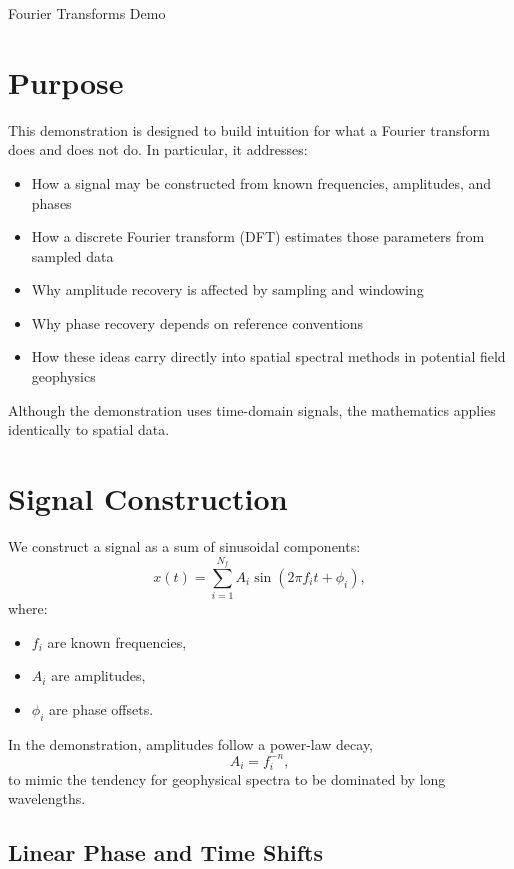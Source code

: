 \begin{activity}{Fourier Transforms Demo}

\section*{Purpose}

This demonstration is designed to build intuition for what a Fourier transform does and does not do.
In particular, it addresses:

\begin{itemize}
  \item How a signal may be constructed from known frequencies, amplitudes, and phases
  \item How a discrete Fourier transform (DFT) estimates those parameters from sampled data
  \item Why amplitude recovery is affected by sampling and windowing
  \item Why phase recovery depends on reference conventions
  \item How these ideas carry directly into spatial spectral methods in potential field geophysics
\end{itemize}

Although the demonstration uses time-domain signals, the mathematics applies identically to spatial data.

\section*{Signal Construction}

We construct a signal as a sum of sinusoidal components:
\begin{equation}
x(t) = \sum_{i=1}^{N_f} A_i \sin\!\left(2\pi f_i t + \phi_i\right),
\end{equation}
where:
\begin{itemize}
  \item $f_i$ are known frequencies,
  \item $A_i$ are amplitudes,
  \item $\phi_i$ are phase offsets.
\end{itemize}

In the demonstration, amplitudes follow a power-law decay,
\begin{equation}
A_i = f_i^{-n},
\end{equation}
to mimic the tendency for geophysical spectra to be dominated by long wavelengths.

\subsection*{Linear Phase and Time Shifts}


\end{activity}
